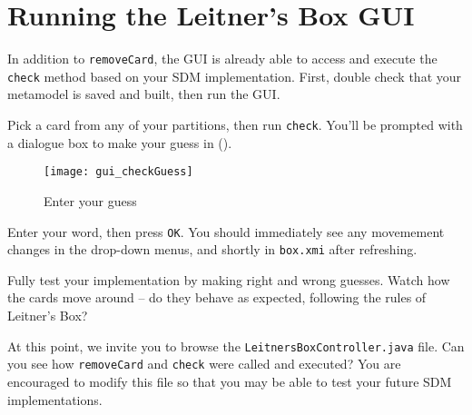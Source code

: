 \newpage
\hypertarget{sec:extendGui}{}
\section{Running the Leitner's Box GUI}
\genHeader

In addition to \texttt{removeCard}, the GUI is already able to access and execute the \texttt{check} method based on your SDM implementation. First, double
check that your metamodel is saved and built, then run the GUI. 

\begin{stepbystep}
\item Pick a card from any of your partitions, then run \texttt{check}. You'll be prompted with a dialogue box to make your guess in
().

\vspace{0.5cm}

\begin{figure}[htp]
\begin{center}
  \texttt{[image: gui\_checkGuess]}
  \caption{Enter your guess}
  \label{eclipse:checkGuess}
\end{center}
\end{figure}

\item Enter your word, then press \texttt{OK}. You should immediately see any movemement changes in the drop-down menus, and shortly in
\texttt{box.xmi} after refreshing.

\vspace{0.5cm}

\item Fully test your implementation by making right and wrong guesses. Watch how the cards move around -- do they
behave as expected, following the rules of Leitner's Box?

\vspace{0.5cm}

\item At this point, we invite you to browse the \texttt{Leitners\-Box\-Control\-ler.java} file. Can you see how \texttt{removeCard} and
\texttt{check} were called and executed? You are encouraged to modify this file so that you may be able to test your future SDM implementations.

\end{stepbystep}

